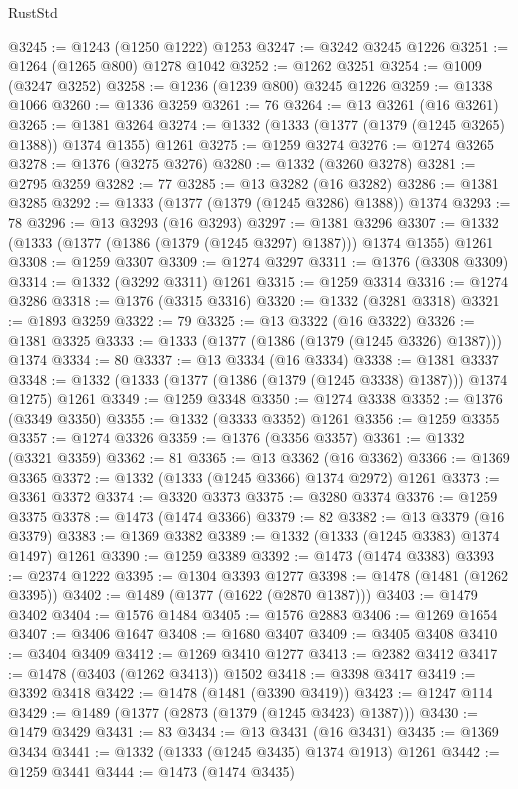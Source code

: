 \begin{lexlean}{RustStd}
\begin{coremodule}
{\begin{coremodule}
{{{{{{{{{{{{{{{{{{{{{{{{{{{{{{{{{{{@3245 := @1243 (@1250 @1222) @1253
@3247 := @3242 @3245 @1226
@3251 := @1264 (@1265 @800) @1278 @1042
@3252 := @1262 @3251
@3254 := @1009 (@3247 @3252)
@3258 := @1236 (@1239 @800) @3245 @1226
@3259 := @1338 @1066
@3260 := @1336 @3259
@3261 := 76
@3264 := @13 @3261 (@16 @3261)
@3265 := @1381 @3264
@3274 := @1332 (@1333 (@1377 (@1379 (@1245 @3265) @1388)) @1374 @1355) @1261
@3275 := @1259 @3274
@3276 := @1274 @3265
@3278 := @1376 (@3275 @3276)
@3280 := @1332 (@3260 @3278)
@3281 := @2795 @3259
@3282 := 77
@3285 := @13 @3282 (@16 @3282)
@3286 := @1381 @3285
@3292 := @1333 (@1377 (@1379 (@1245 @3286) @1388)) @1374
@3293 := 78
@3296 := @13 @3293 (@16 @3293)
@3297 := @1381 @3296
@3307 := @1332 (@1333 (@1377 (@1386 (@1379 (@1245 @3297) @1387))) @1374 @1355) @1261
@3308 := @1259 @3307
@3309 := @1274 @3297
@3311 := @1376 (@3308 @3309)
@3314 := @1332 (@3292 @3311) @1261
@3315 := @1259 @3314
@3316 := @1274 @3286
@3318 := @1376 (@3315 @3316)
@3320 := @1332 (@3281 @3318)
@3321 := @1893 @3259
@3322 := 79
@3325 := @13 @3322 (@16 @3322)
@3326 := @1381 @3325
@3333 := @1333 (@1377 (@1386 (@1379 (@1245 @3326) @1387))) @1374
@3334 := 80
@3337 := @13 @3334 (@16 @3334)
@3338 := @1381 @3337
@3348 := @1332 (@1333 (@1377 (@1386 (@1379 (@1245 @3338) @1387))) @1374 @1275) @1261
@3349 := @1259 @3348
@3350 := @1274 @3338
@3352 := @1376 (@3349 @3350)
@3355 := @1332 (@3333 @3352) @1261
@3356 := @1259 @3355
@3357 := @1274 @3326
@3359 := @1376 (@3356 @3357)
@3361 := @1332 (@3321 @3359)
@3362 := 81
@3365 := @13 @3362 (@16 @3362)
@3366 := @1369 @3365
@3372 := @1332 (@1333 (@1245 @3366) @1374 @2972) @1261
@3373 := @3361 @3372
@3374 := @3320 @3373
@3375 := @3280 @3374
@3376 := @1259 @3375
@3378 := @1473 (@1474 @3366)
@3379 := 82
@3382 := @13 @3379 (@16 @3379)
@3383 := @1369 @3382
@3389 := @1332 (@1333 (@1245 @3383) @1374 @1497) @1261
@3390 := @1259 @3389
@3392 := @1473 (@1474 @3383)
@3393 := @2374 @1222
@3395 := @1304 @3393 @1277
@3398 := @1478 (@1481 (@1262 @3395))
@3402 := @1489 (@1377 (@1622 (@2870 @1387)))
@3403 := @1479 @3402
@3404 := @1576 @1484
@3405 := @1576 @2883
@3406 := @1269 @1654
@3407 := @3406 @1647
@3408 := @1680 @3407
@3409 := @3405 @3408
@3410 := @3404 @3409
@3412 := @1269 @3410 @1277
@3413 := @2382 @3412
@3417 := @1478 (@3403 (@1262 @3413)) @1502
@3418 := @3398 @3417
@3419 := @3392 @3418
@3422 := @1478 (@1481 (@3390 @3419))
@3423 := @1247 @114
@3429 := @1489 (@1377 (@2873 (@1379 (@1245 @3423) @1387)))
@3430 := @1479 @3429
@3431 := 83
@3434 := @13 @3431 (@16 @3431)
@3435 := @1369 @3434
@3441 := @1332 (@1333 (@1245 @3435) @1374 @1913) @1261
@3442 := @1259 @3441
@3444 := @1473 (@1474 @3435)
}}}}}}}}}}}}}}}}}}}}}}}}}}}}}}}}}}}
\end{coremodule}}
\end{coremodule}
\end{lexlean}

